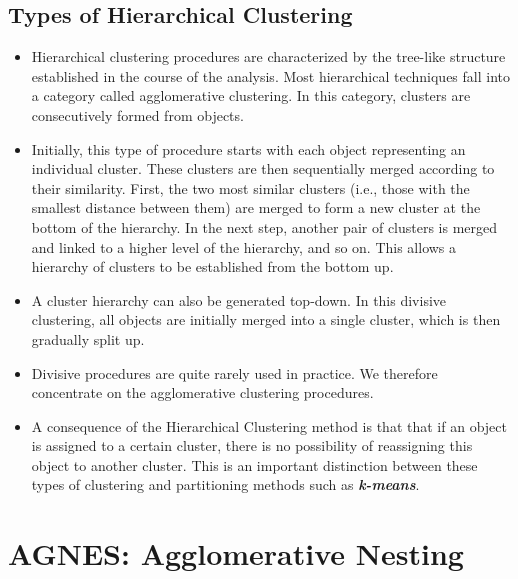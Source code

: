 \subsection{Types of Hierarchical Clustering}
\begin{itemize}
\item
Hierarchical clustering procedures are characterized by the tree-like structure
established in the course of the analysis. Most hierarchical techniques fall into a
category called agglomerative clustering. In this category, clusters are consecutively
formed from objects. 
\item Initially, this type of procedure starts with each object
representing an individual cluster. These clusters are then sequentially merged
according to their similarity. First, the two most similar clusters (i.e., those with
the smallest distance between them) are merged to form a new cluster at the bottom
of the hierarchy. In the next step, another pair of clusters is merged and linked to a
higher level of the hierarchy, and so on. This allows a hierarchy of clusters to be
established from the bottom up.
\item A cluster hierarchy can also be generated top-down. In this divisive clustering,
all objects are initially merged into a single cluster, which is then gradually split up. 
\item Divisive procedures are quite rarely used in practice. We therefore
concentrate on the agglomerative clustering procedures.
\item A consequence of the Hierarchical Clustering method is that that if an object is assigned
to a certain cluster, there is no possibility of reassigning this object to another
cluster. This is an important distinction between these types of clustering and
partitioning methods such as \textbf{\textit{k-means}}.
\end{itemize}



\newpage
\section{AGNES: Agglomerative Nesting}

